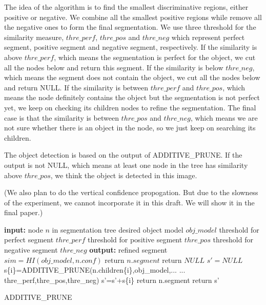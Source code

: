 \documentclass[10pt,twocolumn,letterpaper]{article}
\begin{document}
The idea of the algorithm is to find the smallest discriminative
regions, either positive or negative. We combine all the smallest
positive regions while remove all the negative ones to form the
final segmentation. We use three threshold for the similarity
measure, $thre\_perf$, $thre\_pos$ and $thre\_neg$ which represent
perfect segment, positive segment and negative segment,
respectively. If the similarity is above $thre\_perf$, which means
the segmentation is perfect for the object, we cut all the nodes
below and return this segment. If the similarity is below
$thre\_neg$, which means the segment does not contain the object, we
cut all the nodes below and return NULL. If the similarity is
between $thre\_perf$ and $thre\_pos$, which means the node
definitely contains the object but the segmentation is not perfect
yet, we keep on checking its children nodes to refine the
segmentation. The final case is that the similarity is between
$thre\_pos$ and $thre\_neg$, which means we are not sure whether
there is an object in the node, so we just keep on searching its
children.

The object detection is based on the output of ADDITIVE\_PRUNE. If the output is not NULL, which means at least one node in the tree has similarity above $thre\_pos$, we think the object is detected in this image.

(We also plan to do the vertical confidence propogation. But due to the slowness of the experiment, we cannot incorporate it in this draft. We will show it in the final paper.)


\begin{algorithm}
\begin{algorithmic}
  \STATE \textbf{input:}
  \STATE \hspace{3 mm} node $n$ in segmentation tree
  \STATE \hspace{3 mm} desired object model $obj\_model$
  \STATE \hspace{3 mm} threshold for perfect segment $thre\_perf$
  \STATE \hspace{3 mm} threshold for positive segment $thre\_pos$
  \STATE \hspace{3 mm} threshold for negative segment $thre\_neg$
  \STATE \textbf{output:}
  \STATE \hspace{3 mm} refined segment
  \STATE
  \STATE $sim=HI(obj\_model,n.conf)$
    \STATE return $n.segment$
  \ENDIF
    \STATE return $NULL$
  \ENDIF
  \STATE $s'=NULL$
    \STATE s\{i\}=ADDITIVE\_PRUNE(n.children\{i\},obj\_model,...
    \STATE ... thre\_perf,thre\_pos,thre\_neg)
    \STATE s'=s'+s\{i\}
  \ENDFOR
    \STATE return n.segment
  \ELSE
    \STATE return s'
  \ENDIF
\end{algorithmic}
\caption{ADDITIVE\_PRUNE}
\label{alg:add_prune}
\end{algorithm}
\end{document}
